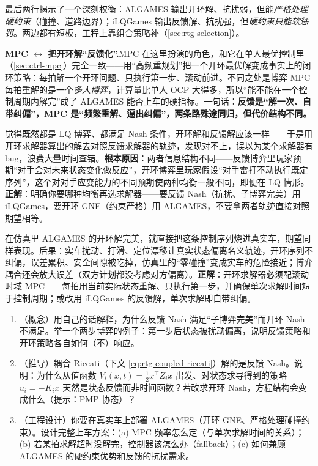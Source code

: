 \noindent 最后两行揭示了一个深刻权衡：ALGAMES 输出开环解、抗扰弱，但能\emph{严格处理硬约束}（碰撞、道路边界）；iLQGames 输出反馈解、抗扰强，但\emph{硬约束只能软惩罚}。两边都有短板，工程上靠组合策略补（\cref{sec:rtg-selection}）。

\begin{insight}
\textbf{MPC $\leftrightarrow$ 把开环解“反馈化”.}\;MPC 在这里扮演的角色，和它在单人最优控制里（\cref{sec:ctrl-mpc}）完全一致——用“高频重规划”把一个开环最优解变成事实上的闭环策略：每拍解一个开环问题、只执行第一步、滚动前进。不同之处是博弈 MPC 每拍重解的是一个\emph{多人博弈}，计算量比单人 OCP 大得多，所以“能不能在一个控制周期内解完”成了 ALGAMES 能否上车的硬指标。一句话：\textbf{反馈是“解一次、自带纠偏”，MPC 是“频繁重解、逼出纠偏”，两条路殊途同归，但代价结构不同。}
\end{insight}

\begin{pitfall}
觉得既然都是 LQ 博弈、都满足 Nash 条件，开环解和反馈解应该一样——于是用开环求解器算出的解去对照反馈求解器的轨迹，发现对不上，误以为某个求解器有 bug，浪费大量时间查错。\textbf{根本原因}：两者信息结构不同——反馈博弈里玩家预期“对手会对未来状态变化做反应”，开环博弈里玩家假设“对手雷打不动执行既定序列”，这个对对手应变能力的不同预期使两种均衡一般不同，即便在 LQ 情形。\textbf{正解}：明确你要哪种均衡再选求解器——要反馈 Nash（抗扰、子博弈完美）用 iLQGames，要开环 GNE（约束严格）用 ALGAMES，不要拿两者轨迹直接对照期望相等。
\end{pitfall}

\begin{pitfall}
在仿真里 ALGAMES 的开环解完美，就直接把这条控制序列烧进真实车，期望同样表现。后果：实车扰动、打滑、定位漂移让真实状态偏离名义轨迹，开环序列不纠偏，误差累积、安全间隙被吃掉，仿真里的“零碰撞”变成实车的危险接近；博弈耦合还会放大误差（双方计划都没考虑对方偏离）。\textbf{正解}：开环求解器必须配滚动时域 MPC——每拍用当前实际状态重解、只执行第一步，并确保单次求解时间短于控制周期；或改用 iLQGames 的反馈解，单次求解即自带纠偏。
\end{pitfall}

\begin{practice}
\begin{enumerate}
  \item （概念）用自己的话解释，为什么反馈 Nash 满足“子博弈完美”而开环 Nash 不满足。举一个两步博弈的例子：第一步后状态被扰动偏离，说明反馈策略和开环策略各自如何（不）响应。
  \item （推导）耦合 Riccati（下文 \cref{eq:rtg-coupled-riccati}）解的是反馈 Nash。说明：为什么从值函数 $V_i(x,t)=\tfrac12 x^\top Z_i x$ 出发、对状态求导得到的策略 $u_i=-K_i x$ 天然是状态反馈而非时间函数？若改求开环 Nash，方程结构会变成什么（提示：PMP 协态）？
  \item （工程设计）你要在真实车上部署 ALGAMES（开环 GNE、严格处理碰撞约束）。设计完整上车方案：(a) MPC 频率怎么定（与单次求解时间的关系）；(b) 若某拍求解超时没解完，控制器该怎么办（fallback）；(c) 如何兼顾 ALGAMES 的硬约束优势和反馈的抗扰需求。
\end{enumerate}
\end{practice}

